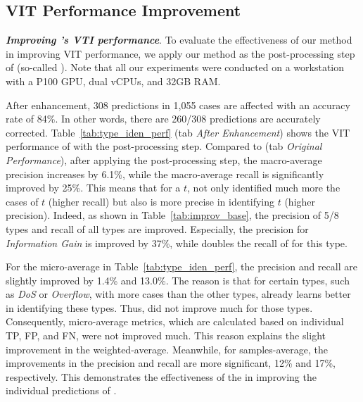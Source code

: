 \subsection{VIT Performance Improvement}
\label{sec:our_results}

\textbf{\textit{Improving \base's VTI performance}}. To evaluate the effectiveness of our method in improving VIT performance, we apply our method as the post-processing step of \base (so-called \ebase). Note that all our experiments were conducted on a workstation with a P100 GPU, dual vCPUs, and 32GB RAM.

After enhancement, 308 predictions in 1,055 cases are affected with an accuracy rate of 84\%. In other words, there are 260/308 predictions are accurately corrected. Table~\ref{tab:type_iden_perf} (tab \textit{After Enhancement}) shows the VIT performance of \base with the post-processing step. 
%
%
%
Compared to \base (tab \textit{Original Performance}), after applying the post-processing step, the macro-average precision increases by 6.1\%, while the macro-average recall is significantly improved by 25\%. This means that for a \vt $t$, \ebase not only identified much more the cases of $t$ (higher recall) but also is more precise in identifying $t$ (higher precision). 
%
Indeed, as shown in Table~\ref{tab:improv_base}, the precision of 5/8 types and recall of all types are improved. Especially, the precision for \textit{Information Gain} is improved by 37\%, while \ebase doubles the recall of \base for this type.

For the micro-average in Table~\ref{tab:type_iden_perf}, the precision and recall are slightly improved by 1.4\% and 13.0\%. The reason is that for certain types, such as \textit{DoS} or \textit{Overflow}, with more cases than the other types, \base already learns better in identifying these types. Thus, \ebase did not improve \base much for those types. Consequently, micro-average metrics, which are calculated based on individual TP, FP, and FN, were not improved much. This reason explains the slight improvement in the weighted-average. 
%
Meanwhile, for samples-average, the improvements in the precision and recall are more significant, 12\% and 17\%, respectively. This demonstrates the effectiveness of the \ebase in improving the individual predictions of \base.



